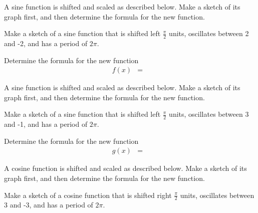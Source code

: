 \begin{problem}
\item A sine function is shifted and scaled as described
  below. Make a sketch of its graph first, and then determine the
  formula for the new function.
  \begin{subproblem}
  \item Make a sketch of a sine function that is shifted left
    $\frac{\pi}{2}$ units, oscillates between 2 and -2, and has a
    period of $2\pi$.

    \vspace{-0.5em}
    \hspace{-7em}\scalebox{0.72}{}

    \item Determine the formula for the new function
      \begin{eqnarray*}
        f(x) & = & 
      \end{eqnarray*}
  \end{subproblem}

\item A sine function is shifted and scaled as described
  below. Make a sketch of its graph first, and then determine the
  formula for the new function.
  \begin{subproblem}
  \item Make a sketch of a sine function that is shifted left
    $\frac{\pi}{2}$ units, oscillates between 3 and -1, and has a
    period of $2\pi$. 

    \vspace{-0.5em}
    \hspace{-7em}\scalebox{0.72}{}

    \item Determine the formula for the new function
      \begin{eqnarray*}
        g(x) & = & 
      \end{eqnarray*}
  \end{subproblem}

\clearpage

\item A cosine function is shifted and scaled as described
  below. Make a sketch of its graph first, and then determine the
  formula for the new function.
  \begin{subproblem}
  \item Make a sketch of a cosine function that is shifted right
    $\frac{\pi}{2}$ units, oscillates between 3 and -3, and has a
    period of $2\pi$.


\end{subproblem}
\end{problem}
